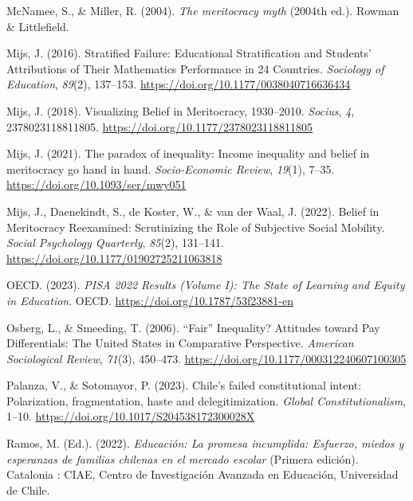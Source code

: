 \documentclass[
  12pt,
  a4paper,
]{article}
\newlength{\cslhangindent}
\newlength{\cslentryspacingunit} %
\newenvironment{CSLReferences}[2] %
 {%
  \setlength{\parindent}{0pt}
  \ifodd #1
  \let\oldpar\par
  \def\par{\hangindent=\cslhangindent\oldpar}
  \fi
  \setlength{\parskip}{#2\cslentryspacingunit}
 }%
 {}
\begin{document}
\begin{CSLReferences}{1}{0}
\leavevmode{}%
McNamee, S., \& Miller, R. (2004). \emph{The meritocracy myth} (2004th
ed.). Rowman \& Littlefield.

\leavevmode{}%
Mijs, J. (2016). Stratified {Failure}: {Educational Stratification} and
{Students}' {Attributions} of {Their Mathematics Performance} in 24
{Countries}. \emph{Sociology of Education}, \emph{89}(2), 137--153.
\url{https://doi.org/10.1177/0038040716636434}

\leavevmode{}%
Mijs, J. (2018). Visualizing {Belief} in {Meritocracy}, 1930--2010.
\emph{Socius}, \emph{4}, 2378023118811805.
\url{https://doi.org/10.1177/2378023118811805}

\leavevmode{}%
Mijs, J. (2021). The paradox of inequality: Income inequality and belief
in meritocracy go hand in hand. \emph{Socio-Economic Review},
\emph{19}(1), 7--35. \url{https://doi.org/10.1093/ser/mwy051}

\leavevmode{}%
Mijs, J., Daenekindt, S., de Koster, W., \& van der Waal, J. (2022).
Belief in {Meritocracy Reexamined}: {Scrutinizing} the {Role} of
{Subjective Social Mobility}. \emph{Social Psychology Quarterly},
\emph{85}(2), 131--141. \url{https://doi.org/10.1177/01902725211063818}

\leavevmode{}%
OECD. (2023). \emph{{PISA} 2022 {Results} ({Volume I}): {The State} of
{Learning} and {Equity} in {Education}}. OECD.
\url{https://doi.org/10.1787/53f23881-en}

\leavevmode{}%
Osberg, L., \& Smeeding, T. (2006). {``{Fair}''} {Inequality}?
{Attitudes} toward {Pay Differentials}: {The United States} in
{Comparative Perspective}. \emph{American Sociological Review},
\emph{71}(3), 450--473. \url{https://doi.org/10.1177/000312240607100305}

\leavevmode{}%
Palanza, V., \& Sotomayor, P. (2023). Chile's failed constitutional
intent: {Polarization}, fragmentation, haste and delegitimization.
\emph{Global Constitutionalism}, 1--10.
\url{https://doi.org/10.1017/S204538172300028X}

\leavevmode{}%
Ramos, M. (Ed.). (2022). \emph{Educaci{ó}n: {La} promesa incumplida:
Esfuerzo, miedos y esperanzas de familias chilenas en el mercado
escolar} (Primera edici{ó}n). Catalonia : CIAE, Centro de
Investigaci{ó}n Avanzada en Educaci{ó}n, Universidad de Chile.


\end{CSLReferences}
\end{document}
